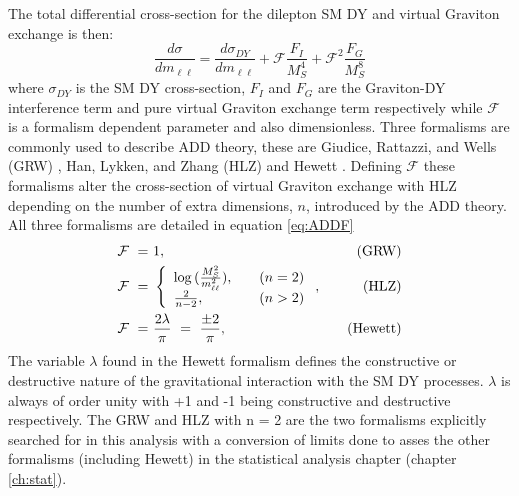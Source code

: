         The total differential cross-section for the dilepton SM DY and virtual Graviton exchange is then:
        \begin{equation}
            \frac{d\sigma}{dm_{\ell\ell}} =
                \frac{d\sigma_{DY}}{dm_{\ell\ell}} +
                \mathcal{F}\frac{F_{I}}{M_{S}^{4}} +
                \mathcal{F}^{2}\frac{F_{G}}{M_{S}^{8}}
            \label{eq:ADDcs}
        \end{equation}
        where $\sigma_{DY}$ is the SM DY cross-section, $F_{I}$ and $F_{G}$ are the Graviton-DY interference term and pure virtual Graviton exchange term respectively while $\mathcal{F}$ is a formalism dependent parameter and also dimensionless. 
        Three formalisms are commonly used to describe ADD theory, these are Giudice, Rattazzi, and Wells (GRW) \cite{Giudice:1998ck}, Han, Lykken, and Zhang (HLZ) \cite{PhysRevD.59.105006} and Hewett \cite{PhysRevLett.82.4765}. Defining $\mathcal{F}$ these formalisms alter the cross-section of virtual Graviton exchange with HLZ depending on the number of extra dimensions, $n$, introduced by the ADD theory. All three formalisms are detailed in equation \ref{eq:ADDF}
        \begin{equation}
            \begin{aligned}
                \mathcal{F}~=&~1,   \quad &\text{(GRW)} \\
                \mathcal{F}~=&~  \left\{ 
                    \begin{array}{l l}
                        \log{(\frac{M_{S}^{2}}{m_{\ell\ell}^{2}})},      \quad & (n = 2) \\
                        \frac{2}{n-2},                                   \quad & (n > 2)
                    \end{array} \right.,  \quad &\text{(HLZ)}  \\
                \mathcal{F}~=&~\frac{2\lambda}{\pi}~=~\frac{\pm2}{\pi},     \quad &\text{(Hewett)}
            \end{aligned}
            \label{eq:ADDF}
        \end{equation}
        The variable $\lambda$ found in the Hewett formalism defines the constructive or destructive nature of the gravitational interaction with the SM DY processes. $\lambda$ is always of order unity with +1 and -1 being constructive and destructive respectively.
        The GRW and HLZ with n = 2 are the two formalisms explicitly searched for in this analysis with a conversion of limits done to asses the other formalisms (including Hewett) in the statistical analysis chapter (chapter \ref{ch:stat}).

